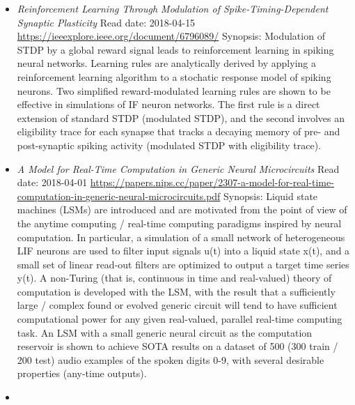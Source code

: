 \documentclass{article}%
\begin{document}
\begin{itemize}
\item%
\textit{Reinforcement Learning Through Modulation of Spike{-}Timing{-}Dependent Synaptic Plasticity}%
\newline%
Read date: 2018{-}04{-}15%
\newline%
\href{https://ieeexplore.ieee.org/document/6796089/}{https://ieeexplore.ieee.org/document/6796089/}%
\newline%
Synopsis: Modulation of STDP by a global reward signal leads to reinforcement learning in spiking neural networks. Learning rules are analytically derived by applying a reinforcement learning algorithm to a stochatic response model of spiking neurons. Two simplified reward{-}modulated learning rules are shown to be effective in simulations of IF neuron networks. The first rule is a direct extension of standard STDP (modulated STDP), and the second involves an eligibility trace for each synapse that tracks a decaying memory of pre{-} and post{-}synaptic spiking activity (modulated STDP with eligibility trace).%
\item%
\textit{A Model for Real{-}Time Computation in Generic Neural Microcircuits}%
\newline%
Read date: 2018{-}04{-}01%
\newline%
\href{https://papers.nips.cc/paper/2307{-}a{-}model{-}for{-}real{-}time{-}computation{-}in{-}generic{-}neural{-}microcircuits.pdf}{https://papers.nips.cc/paper/2307{-}a{-}model{-}for{-}real{-}time{-}computation{-}in{-}generic{-}neural{-}microcircuits.pdf}%
\newline%
Synopsis: Liquid state machines (LSMs) are introduced and are motivated from the point of view of the anytime computing / real{-}time computing paradigms inspired by neural computation. In particular, a simulation of a small network of heterogeneous LIF neurons are used to filter input signals u(t) into a liquid state x(t), and a small set of linear read{-}out filters are optimized to output a target time series y(t). A non{-}Turing (that is, continuous in time and real{-}valued) theory of computation is developed with the LSM, with the result that a sufficiently large / complex found or evolved generic circuit will tend to have sufficient computational power for any given real{-}valued, parallel real{-}time computing task. An LSM with a small generic neural circuit as the computation reservoir is shown to achieve SOTA results on a dataset of 500 (300 train / 200 test) audio examples of the spoken digits 0{-}9, with several desirable properties (any{-}time outputs).%
\item%

\end{itemize}
\end{document}
